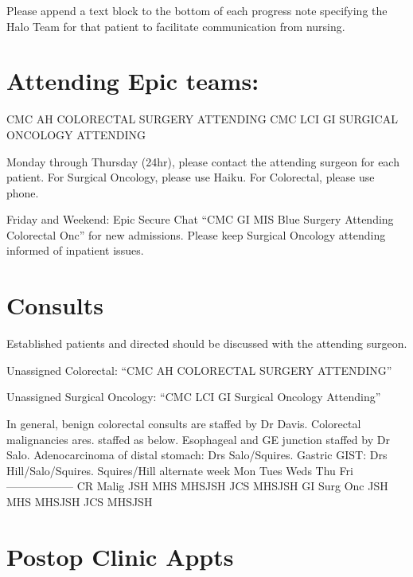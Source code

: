 \documentclass[
]{book}
\begin{document}
Please append a text block to the bottom of each progress note specifying the Halo Team for that patient to facilitate communication from nursing.

\hypertarget{attending-epic-teams}{%
\section{Attending Epic teams:}\label{attending-epic-teams}}

CMC AH COLORECTAL SURGERY ATTENDING
CMC LCI GI SURGICAL ONCOLOGY ATTENDING

Monday through Thursday (24hr), please contact the attending surgeon for each patient. For Surgical Oncology, please use Haiku. For Colorectal, please use phone.

Friday and Weekend: Epic Secure Chat ``CMC GI MIS Blue Surgery Attending Colorectal Onc'' for new admissions. Please keep Surgical Oncology attending informed of inpatient issues.

\hypertarget{consults}{%
\section{Consults}\label{consults}}

Established patients and directed should be discussed with the attending surgeon.

Unassigned Colorectal: ``CMC AH COLORECTAL SURGERY ATTENDING''

Unassigned Surgical Oncology: ``CMC LCI GI Surgical Oncology Attending''

In general, benign colorectal consults are staffed by Dr Davis. Colorectal malignancies ares.
staffed as below. Esophageal and GE junction staffed by Dr Salo. Adenocarcinoma of distal stomach: Drs Salo/Squires. Gastric GIST: Drs Hill/Salo/Squires. Squires/Hill alternate week
\textbar{} \textbar{} Mon \textbar{} Tues \textbar{} Weds \textbar{} Thu \textbar{} Fri \textbar{}
\textbar---\textbar---\textbar---\textbar---\textbar---\textbar---\textbar{}
\textbar{} CR Malig \textbar{} JSH \textbar{} MHS \textbar{} MHSJSH \textbar{} JCS \textbar{} MHSJSH \textbar{}
\textbar{} GI Surg Onc \textbar{} JSH \textbar{} MHS \textbar{} MHSJSH \textbar{} JCS \textbar{} MHSJSH \textbar{}

\hypertarget{postop-clinic-appts}{%
\section{Postop Clinic Appts}\label{postop-clinic-appts}}
\end{document}
